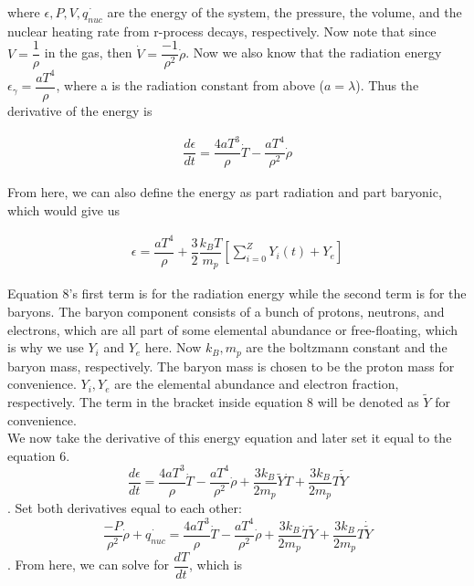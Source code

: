 \documentclass[11pt,a4paper]{article}
\begin{document}
where $\epsilon, P, V, \dot{q_{nuc}}$ are the energy of the system, the pressure, the volume, and the nuclear heating rate from r-process decays, respectively. Now note that since $ V = \dfrac{1}{\rho} $ in the gas, then $ \dot{V} = \dfrac{-1}{\rho ^2}\dot{\rho} $. Now we also know that the radiation energy  $\epsilon_{\gamma} =\dfrac{a T^4}{\rho}$, where a is the radiation constant from above ($a = \lambda$). Thus the derivative of the energy is 

\begin{align}
	\dfrac{d \epsilon}{dt} = \dfrac{4a T^3}{\rho} \dot{T} - 			\dfrac{a T^4}{\rho^2}\dot{\rho} 
\end{align}

From here, we can also define the energy as part radiation and part baryonic, which would give us 

\begin{align}
	\epsilon = \dfrac{a T^4}{\rho} + \dfrac{3}{2} \dfrac{k_B T}			{m_p} [\sum_{i=0}^{Z} Y_i(t) + Y_e] 
\end{align}

Equation 8's first term is for the radiation energy while the second term is for the baryons. The baryon component consists of a bunch of protons, neutrons, and electrons, which are all part of some elemental abundance or free-floating, which is why we use $Y_i$ and $Y_e$ here. Now $k_B, m_p$ are the boltzmann constant and the baryon mass, respectively. The baryon mass is chosen to be the proton mass for convenience. $Y_i, Y_e$ are the elemental abundance and electron fraction, respectively. The term in the bracket inside equation 8 will be denoted as $\tilde{Y}$ for convenience.\\
We now take the derivative of this energy equation and later set it equal to the equation 6.
$$ \dfrac{d \epsilon}{dt} = \dfrac{4a T^3}{\rho}\dot{T} - \dfrac{a T^4}{\rho^2} \dot{\rho} + \dfrac{3 k_B}{2 m_p} \tilde{Y} \dot{T} + \dfrac{3 k_B}{2 m_p} T \tilde{\dot{Y}} $$. Set both derivatives equal to each other:
$$ \dfrac{-P}{\rho^2} \dot{\rho} + \dot{q_{nuc}} = \dfrac{4a T^3}{\rho} \dot{T} -  \dfrac{aT^4}{\rho^2} \dot{\rho} + \dfrac{3 k_B}{2 m_p} \dot{T} \tilde{Y} + \dfrac{3 k_B}{2 m_p} T \dot{\tilde{Y}} $$. From here, we can solve for $\dfrac{dT}{dt}$, which is 
\end{document}
